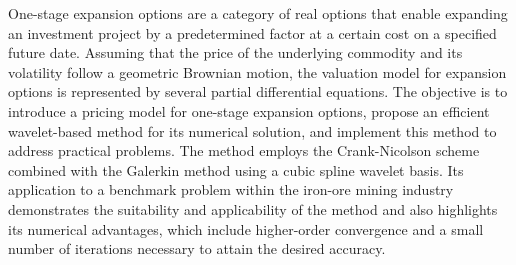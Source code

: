 
\begin{Abstrakt}
    One-stage expansion options are a category of real options that enable expanding an investment project by a predetermined factor at a certain cost on a specified future date. Assuming that the price of the underlying commodity and its volatility follow a geometric Brownian motion, the valuation model for expansion options is represented by several partial differential equations. The objective is to introduce a pricing model for one-stage expansion options, propose an efficient wavelet-based method for its numerical solution, and implement this method to address practical problems. The method employs the Crank-Nicolson scheme combined with the Galerkin method using a cubic spline wavelet basis. Its application to a benchmark problem within the iron-ore mining industry demonstrates the suitability and applicability of the method and also highlights its numerical advantages, which include higher-order convergence and a small number of iterations necessary to attain the desired accuracy.
\end{Abstrakt}



\clearpage